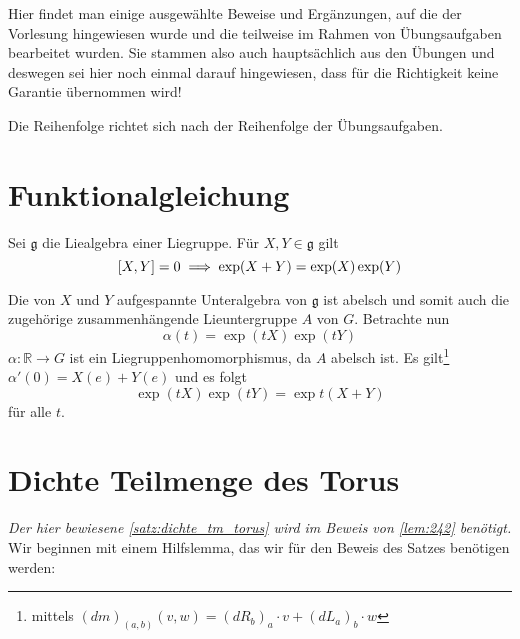 Hier findet man einige ausgewählte Beweise und Ergänzungen, auf die der Vorlesung hingewiesen wurde und die teilweise im Rahmen von Übungsaufgaben bearbeitet wurden.
Sie stammen also auch hauptsächlich aus den Übungen und deswegen sei hier noch einmal darauf hingewiesen, dass für die Richtigkeit keine Garantie übernommen wird!

Die Reihenfolge richtet sich nach der Reihenfolge der Übungsaufgaben.

\section{Funktionalgleichung} %
\label{sec:funktionalgleichung}
Sei $\mathfrak{g}$ die Liealgebra einer Liegruppe.
Für $X,Y \in \mathfrak{g}$ gilt
\[
	\benbrace*{X,Y} = 0 \implies \exp(X+Y) = \exp(X) \exp(Y)
\]
\begin{beweis}
	Die von $X$ und $Y$ aufgespannte Unteralgebra von $\mathfrak{g}$ ist abelsch und somit auch die zugehörige zusammenhängende Lieuntergruppe $A$ von $G$.
	Betrachte nun
	\[
		\alpha(t) = \exp(t X) \exp(t Y)
	\]
	$\alpha \colon \mathbb{R} \to G$ ist ein Liegruppenhomomorphismus, da $A$ abelsch ist.
	Es gilt\footnote{mittels $(d m)_{(a,b)}(v,w) = (d R_b)_a \cdot v + (d L_a)_b \cdot w$} $\alpha'(0) = X(e) + Y(e)$ und es folgt
	\[
		\exp(t X) \exp(tY) = \exp t (X+Y)
	\]
	für alle $t$.
\end{beweis}


\section{Dichte Teilmenge des Torus} %
\label{sec:dichte_teilmenge_torus}
\emph{Der hier bewiesene \autoref{satz:dichte_tm_torus} wird im Beweis von \autoref{lem:242} benötigt.}\smallskip \\
Wir beginnen mit einem Hilfslemma, das wir für den Beweis des Satzes benötigen werden:

